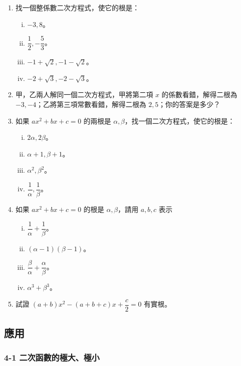 \begin{enumerate}
  \item 找一個整係數二次方程式，使它的根是：
  \begin{enumerate}[(i)]
    \item $-3, 8$。
    \item $\dfrac{1}{2}, -\dfrac{5}{3}$。
    \item $-1+\sqrt{2}, -1-\sqrt{2}$。
    \item $-2+\sqrt{3}, -2-\sqrt{3}$。
  \end{enumerate}

  \item 甲，乙兩人解同一個二次方程式，甲將第二項 $x$ 的係數看錯，解得二根為 $-3, -4$；乙將第三項常數看錯，解得二根為 $2, 5$；你的答案是多少？

  \item 如果 $ax^2+bx+c=0$ 的兩根是 $\alpha, \beta$，找一個二次方程式，使它的根是：
  \begin{enumerate}[(i)]
    \item $2\alpha, 2\beta$。
    \item $\alpha+1, \beta+1$。
    \item $\alpha^2, \beta^2$。
    \item $\dfrac{1}{\alpha}, \dfrac{1}{\beta}$。
  \end{enumerate}

  \item 如果 $ax^2+bx+c=0$ 的根是 $\alpha, \beta$，請用 $a, b, c$ 表示
  \begin{enumerate}[(i)]
    \item $\dfrac{1}{\alpha} + \dfrac{1}{\beta}$。
    \item $(\alpha-1)(\beta-1)$。
    \item $\dfrac{\beta}{\alpha} + \dfrac{\alpha}{\beta}$。
    \item $\alpha^3 + \beta^3$。
  \end{enumerate}

  \item 試證 $(a+b)x^2 - (a+b+c)x + \dfrac{c}{2} = 0$ 有實根。
\end{enumerate}

\subsection{應用}\label{sec:b2_1-4}

\subsubsection*{4-1 二次函數的極大、極小}

